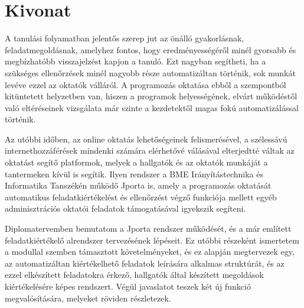 \chapter*{Kivonat}%

A tanulási folyamatban jelentős szerep jut az önálló gyakorlásnak, feladatmegoldásnak, amelyhez fontos, hogy eredményességéről minél gyorsabb és megbízhatóbb visszajelzést kapjon a tanuló.
Ezt nagyban segítheti, ha a szükséges ellenőrzések minél nagyobb része automatizáltan történik, sok munkát levéve ezzel az oktatók válláról.
A programozás oktatása ebből a szempontból kitüntetett helyzetben van, hiszen a programok helyességének, elvárt működéstől való eltéréseinek vizsgálata már szinte a kezdetektől magas fokú automatizálással történik.

Az utóbbi időben, az online oktatás lehetőségeinek felismerésével, a szélessávú internethozzáférések mindenki számára elérhetővé válásával elterjedtté váltak az oktatást segítő platformok, melyek a hallgatók és az oktatók munkáját a tantermeken kívül is segítik.
Ilyen rendszer a BME Irányítástechnika és Informatika Tanszékén működő Jporta is, amely a programozás oktatását automatikus feladatkiértékelést és ellenőrzést végző funkciója mellett egyéb adminisztrációs oktatói feladatok támogatásával igyekszik segíteni.

Diplomatervemben bemutatom a Jporta rendszer működését, és a már említett feladatkiértékelő alrendszer tervezésének lépéseit.
Ez utóbbi részeként ismertetem a modullal szemben támasztott követelményeket, és ez alapján megtervezek egy, az automatizáltan kiértékelhető feladatok leírására alkalmas struktúrát, és az ezzel elkészített feladatokra érkező, hallgatók által készített megoldások kiértékelésére képes rendszert.
Végül javaslatot teszek két új funkció megvalósítására, melyeket röviden részletezek.
\vfill

